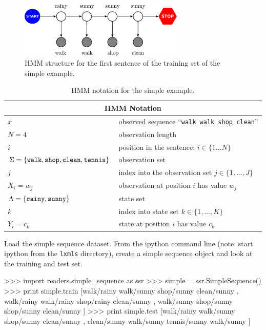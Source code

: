 \begin{figure}[ht]
\centering
\includegraphics[width=0.7\textwidth]{figs/sequences/hmm_new}
\caption[HMM running example]{\label{fig:hmm}HMM structure for the first sentence of the training set of the simple example.}
\end{figure}

\begin{table}[h]
\begin{center}
\begin{tabular}{|l|l|}
\hline
\multicolumn{2}{|c|}{HMM Notation}\\
\hline
\hline
$x$ & observed sequence ``{\tt walk walk shop clean}'' \\
\hline
$N = 4$ & observation length \\
\hline
$i$ & position in the sentence: $i \in \{1 \ldots N\}$ \\
\hline
$\Sigma = \{\text{{\tt walk}},\text{{\tt shop}},\text{{\tt clean}},\text{{\tt tennis}}\}$ & observation set \\
\hline 
$j$ & index into the observation set $j \in \{1,\ldots, J\}$\\
\hline
$X_i = w_j$ & observation at position $i$ 
has value $w_j$\\
\hline 
$\Lambda = \{\text{{\tt rainy}},\text{{\tt sunny}}\}$ & state set\\
\hline 
$k$ & index into state set $k \in \{1,\ldots,K\}$\\
\hline
$Y_i = c_k$ & state at position $i$ has value $c_k$ \\ %
\hline
\end{tabular}
\end{center}
\caption[HMM notation]{\label{tab:hmm-simple-notation} HMM notation for the simple example.}
\end{table}



\begin{exercise}
Load the simple sequence dataset. 
From the ipython command line (note: start ipython from the {\tt lxmls}
directory), create a simple sequence object and look at the training
and test set.
\begin{python}
>>> import readers.simple_sequence as ssr
>>> simple = ssr.SimpleSequence()
>>> print simple.train
[walk/rainy walk/sunny shop/sunny clean/sunny , walk/rainy walk/rainy shop/rainy clean/sunny , walk/sunny shop/sunny shop/sunny clean/sunny ]
>>> print simple.test
[walk/rainy walk/sunny shop/sunny clean/sunny , clean/sunny walk/sunny tennis/sunny walk/sunny ]
\end{python}
\end{exercise}

